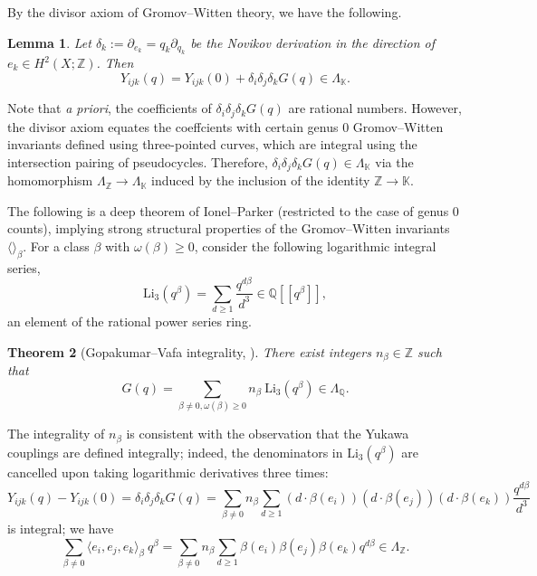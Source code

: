 \documentclass[reqno]{amsart}
\numberwithin{equation}{section}
\numberwithin{equation}{section}
\numberwithin{equation}{section}
\newtheorem{thm}{Theorem}[section]
\newtheorem{lemma}[thm]{Lemma}
\theoremstyle{definition}
\theoremstyle{remark}
\theoremstyle{remark}
\begin{document}
By the divisor axiom of Gromov--Witten theory, we have the following.
\begin{lemma}\label{lem:yukawa-as-third-derivative}
    Let $\delta_k := \partial_{e_k} = q_k \partial_{q_k}$ be the Novikov derivation in the direction of $e_k \in H^2(X;\mathbb{Z})$. Then
    \begin{equation}
        Y_{ijk}(q) = Y_{ijk}(0) + \delta_i \delta_j \delta_k  G(q) \in \Lambda_{\mathbb{K}}.
    \end{equation}
\end{lemma}
Note that \emph{a priori}, the coefficients of $\delta_i \delta_j \delta_k  G(q)$ are rational numbers. However, the divisor axiom equates the coeffcients with certain genus $0$ Gromov--Witten invariants defined using three-pointed curves, which are integral using the intersection pairing of pseudocycles. Therefore, $\delta_i \delta_j \delta_k  G(q) \in \Lambda_{\mathbb{K}}$ via the homomorphism $\Lambda_{\mathbb{Z}} \to \Lambda_{\mathbb{K}}$ induced by the inclusion of the identity $\mathbb{Z} \to \mathbb{K}$.

The following is a deep theorem of Ionel--Parker \cite{IP-GV} (restricted to the case of genus $0$ counts), implying strong structural properties of the Gromov--Witten invariants $\langle \rangle_\beta$. For a class $\beta$ with $\omega(\beta) \ge 0$, consider the following logarithmic integral series,
\begin{equation}
    \mathrm{Li}_3(q^\beta) = \sum_{d \ge 1} \frac{q^{d \beta}}{d^3} \in \mathbb{Q}[\![q^\beta]\!],
\end{equation}
an element of the rational power series ring.

\begin{thm}[{Gopakumar--Vafa integrality, \cite{IP-GV}}]
    \label{thm:gv-integrality}There exist integers $n_\beta \in \mathbb{Z}$ such that
    \begin{equation}
        G(q) = \sum_{\beta \neq 0, \omega(\beta) \ge 0 } n_\beta \ \mathrm{Li}_3 (q^\beta) \in \Lambda_{\mathbb{Q}}.
    \end{equation}
\end{thm}
The integrality of $n_\beta$ is consistent with the observation that the Yukawa couplings are defined integrally; indeed, the denominators in $\mathrm{Li}_3(q^\beta)$ are cancelled upon taking logarithmic derivatives three times:
\begin{equation}
    Y_{ijk}(q) - Y_{ijk}(0) = \delta_i \delta_j \delta_k G(q) = \sum_{\beta \neq 0 } n_\beta \sum_{ d \ge 1} (d \cdot \beta(e_i) ) (d \cdot \beta(e_j)) (d \cdot \beta(e_k))  \frac{q^{d \beta}}{d^3}
\end{equation}
is integral; we have
\begin{equation}
   \sum_{\beta \neq 0}  \langle e_i, e_j, e_k \rangle_\beta  \ q^\beta =  \sum_{\beta \neq 0} n_\beta \sum_{d \ge 1} \beta(e_i) \beta(e_j) \beta(e_k) q^{d \beta} \in \Lambda_{\mathbb{Z}}. 
\end{equation}
\end{document}
